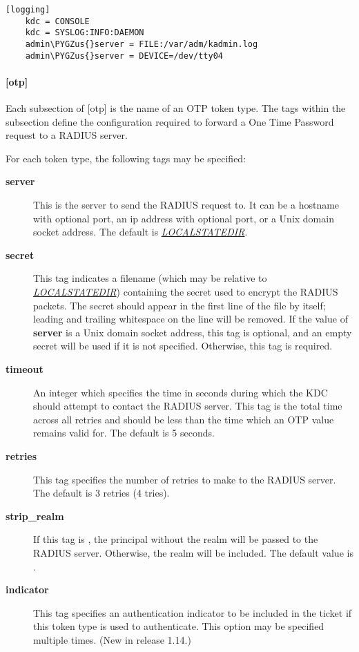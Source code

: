 \documentclass[letterpaper,10pt,english]{sphinxmanual}
\def\PYGZus{\char`\_}
\begin{document}
\begin{Verbatim}[commandchars=\\\{\}]
[logging]
    kdc = CONSOLE
    kdc = SYSLOG:INFO:DAEMON
    admin\PYGZus{}server = FILE:/var/adm/kadmin.log
    admin\PYGZus{}server = DEVICE=/dev/tty04
\end{Verbatim}


\paragraph{{[}otp{]}}
\label{admin/conf_files/kdc_conf:otp}\label{admin/conf_files/kdc_conf:id5}
Each subsection of {[}otp{]} is the name of an OTP token type.  The tags
within the subsection define the configuration required to forward a
One Time Password request to a RADIUS server.

For each token type, the following tags may be specified:
\begin{description}
\item[{\textbf{server}}] \leavevmode
This is the server to send the RADIUS request to.  It can be a
hostname with optional port, an ip address with optional port, or
a Unix domain socket address.  The default is
{\hyperref[mitK5defaults:paths]{\emph{LOCALSTATEDIR}}}.

\item[{\textbf{secret}}] \leavevmode
This tag indicates a filename (which may be relative to {\hyperref[mitK5defaults:paths]{\emph{LOCALSTATEDIR}}})
containing the secret used to encrypt the RADIUS packets.  The
secret should appear in the first line of the file by itself;
leading and trailing whitespace on the line will be removed.  If
the value of \textbf{server} is a Unix domain socket address, this tag
is optional, and an empty secret will be used if it is not
specified.  Otherwise, this tag is required.

\item[{\textbf{timeout}}] \leavevmode
An integer which specifies the time in seconds during which the
KDC should attempt to contact the RADIUS server.  This tag is the
total time across all retries and should be less than the time
which an OTP value remains valid for.  The default is 5 seconds.

\item[{\textbf{retries}}] \leavevmode
This tag specifies the number of retries to make to the RADIUS
server.  The default is 3 retries (4 tries).

\item[{\textbf{strip\_realm}}] \leavevmode
If this tag is , the principal without the realm will be
passed to the RADIUS server.  Otherwise, the realm will be
included.  The default value is .

\item[{\textbf{indicator}}] \leavevmode
This tag specifies an authentication indicator to be included in
the ticket if this token type is used to authenticate.  This
option may be specified multiple times.  (New in release 1.14.)

\end{description}
\end{document}
